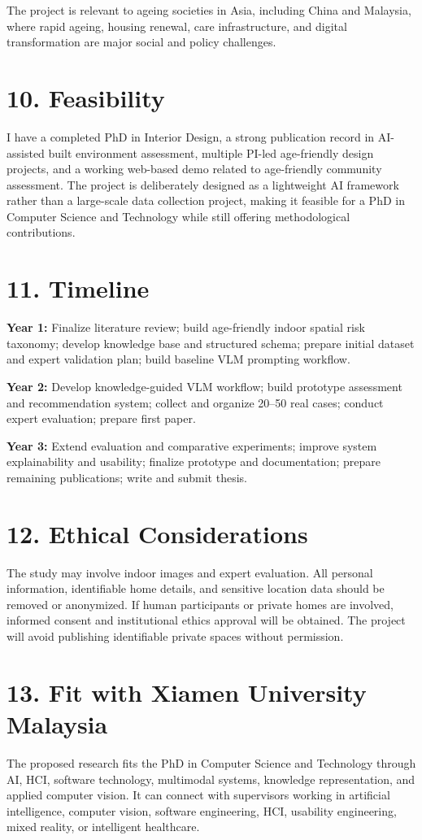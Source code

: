 \documentclass[11pt,a4paper]{article}
\begin{document}
The project is relevant to ageing societies in Asia, including China and Malaysia, where rapid ageing, housing renewal, care infrastructure, and digital transformation are major social and policy challenges.

\section*{10. Feasibility}
I have a completed PhD in Interior Design, a strong publication record in AI-assisted built environment assessment, multiple PI-led age-friendly design projects, and a working web-based demo related to age-friendly community assessment. The project is deliberately designed as a lightweight AI framework rather than a large-scale data collection project, making it feasible for a PhD in Computer Science and Technology while still offering methodological contributions.

\section*{11. Timeline}
\textbf{Year 1:} Finalize literature review; build age-friendly indoor spatial risk taxonomy; develop knowledge base and structured schema; prepare initial dataset and expert validation plan; build baseline VLM prompting workflow.

\textbf{Year 2:} Develop knowledge-guided VLM workflow; build prototype assessment and recommendation system; collect and organize 20--50 real cases; conduct expert evaluation; prepare first paper.

\textbf{Year 3:} Extend evaluation and comparative experiments; improve system explainability and usability; finalize prototype and documentation; prepare remaining publications; write and submit thesis.

\section*{12. Ethical Considerations}
The study may involve indoor images and expert evaluation. All personal information, identifiable home details, and sensitive location data should be removed or anonymized. If human participants or private homes are involved, informed consent and institutional ethics approval will be obtained. The project will avoid publishing identifiable private spaces without permission.

\section*{13. Fit with Xiamen University Malaysia}
The proposed research fits the PhD in Computer Science and Technology through AI, HCI, software technology, multimodal systems, knowledge representation, and applied computer vision. It can connect with supervisors working in artificial intelligence, computer vision, software engineering, HCI, usability engineering, mixed reality, or intelligent healthcare.
\end{document}

